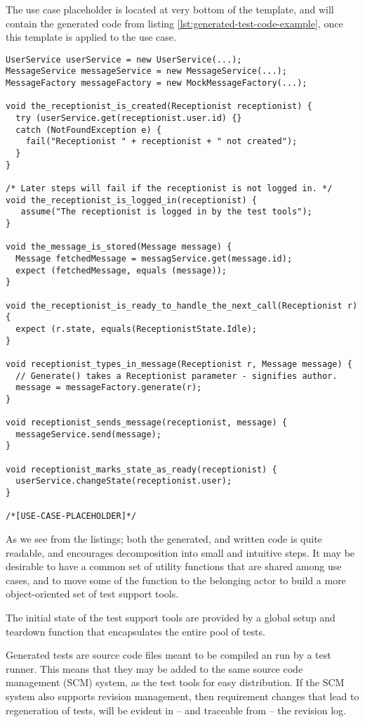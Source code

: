 \noindent The use case placeholder is located at very bottom of the template, and will contain the generated code from listing \ref{lst:generated-test-code-example}, once this template is applied to the use case.
\begin{lstlisting}[style=Dart, caption=Example template methods (written manually),label={lst:example-template-methods}]
UserService userService = new UserService(...);
MessageService messageService = new MessageService(...);
MessageFactory messageFactory = new MockMessageFactory(...);
  
void the_receptionist_is_created(Receptionist receptionist) {
  try (userService.get(receptionist.user.id) {}
  catch (NotFoundException e) {
    fail("Receptionist " + receptionist + " not created");
  }
}

/* Later steps will fail if the receptionist is not logged in. */
void the_receptionist_is_logged_in(receptionist) {
   assume("The receptionist is logged in by the test tools");
}

void the_message_is_stored(Message message) {
  Message fetchedMessage = messagService.get(message.id);
  expect (fetchedMessage, equals (message));
}

void the_receptionist_is_ready_to_handle_the_next_call(Receptionist r) {
  expect (r.state, equals(ReceptionistState.Idle);
}

void receptionist_types_in_message(Receptionist r, Message message) {
  // Generate() takes a Receptionist parameter - signifies author.
  message = messageFactory.generate(r);
}

void receptionist_sends_message(receptionist, message) {
  messageService.send(message);
}

void receptionist_marks_state_as_ready(receptionist) {
  userService.changeState(receptionist.user);
} 

/*[USE-CASE-PLACEHOLDER]*/
\end{lstlisting}
As we see from the listings; both the generated, and written code is quite readable, and encourages decomposition into small and intuitive steps. It may be desirable to have a common set of utility functions that are shared among use cases, and to move some of the function to the belonging actor to build a more object-oriented set of test support tools.\medskip

\noindent The initial state of the test support tools are provided by a global setup and teardown function that encapsulates the entire pool of tests.\medskip

\noindent Generated tests are source code files meant to be compiled an run by a test runner. This means that they may be added to the same source code management (SCM) system, as the test tools for easy distribution. If the SCM system also supports revision management, then requirement changes that lead to regeneration of tests, will be evident in -- and traceable from -- the revision log.
